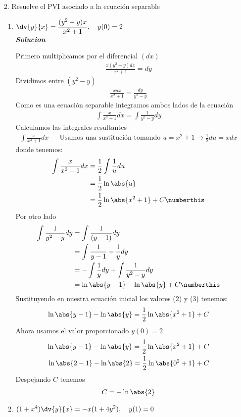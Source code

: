 \begin{enumerate}
    \item[2.] Resuelve el PVI asociado a la ecuación separable
\begin{enumerate}
    \item $\displaystyle \dv{y}{x}= \frac{(y^{2}-y)x}{x^{2}+1}, \quad y(0)=2$\\
    
\textit{ \textbf{Solucion}}    

    Primero multiplicamos por el diferencial $(dx)$
    \begin{align*}
        \frac{x(y^{2}-y)dx}{x^{2}+1}= dy
    \end{align*}
    Dividimos entre $(y^{2}-y)$
    \begin{align*}
        \frac{xdx}{x^{2}+1}= \frac{dy}{y^{2}-y}
    \end{align*}
    Como es una ecuación separable integramos ambos lados de la ecuación
    \begin{align*}
        \int \frac{x}{x^{2}+1}dx = \int \frac{1}{y^{2}-y}dy
    \end{align*}
    Calculamos las integrales resultantes
    \begin{align*}
        \int \frac{x}{x^{2}+1} dx
         & & \text{Usamos una sustitución tomando } u=x^{2}+1 \rightarrow \frac{1}{2}du=xdx
    \end{align*}
    donde tenemos:
    \begin{align*}
        \int \frac{x}{x^{2}+1}dx &= \frac{1}{2}\int \frac{1}{u}du\\
        & = \frac{1}{2} \ln \abs{u}\\
        & = \frac{1}{2} \ln \abs{x^{2}+1}+C \numberthis
    \end{align*}
    Por otro lado
    \begin{align*}
        \int \frac{1}{y^{2}-y}dy &= \int \frac{1}{(y-1)}dy\\
        & = \int \frac{1}{y-1}-\frac{1}{y}dy\\
        & = - \int \frac{1}{y}dy + \int \frac{1}{y^{2}-y}dy\\
        & = \ln \abs{y-1} - \ln \abs{y} +C \numberthis
    \end{align*}
    Sustituyendo en nuestra ecuación inicial los valores (2) y (3) tenemos:
    \begin{align*}
         \ln \abs{y-1} - \ln \abs{y} = \frac{1}{2} \ln \abs{x^{2}+1}+C
    \end{align*}
    Ahora usamos el valor proporcionado $y(0)=2$
    \begin{align*}
         \ln \abs{y-1} - \ln \abs{y} = \frac{1}{2} \ln \abs{x^{2}+1}+C \\
          \ln \abs{2-1} - \ln \abs{2} = \frac{1}{2} \ln \abs{0^{2}+1}+C
    \end{align*}
    Despejando $C$ tenemos
    \begin{align*}
        C= - \ln\abs{2}
    \end{align*}
    \item $\displaystyle (1+x^{4})\dv{y}{x}=-x(1+4y^{2}), \quad y(1)=0$\\
    

\end{enumerate}
\end{enumerate}
